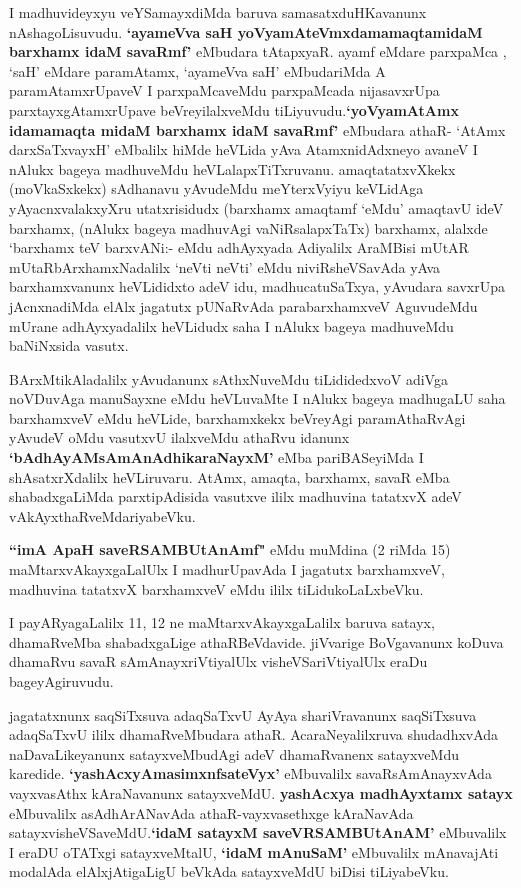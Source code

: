 \begin{artha}
 I madhuvideyxyu veYSamayxdiMda baruva samasatxduHKavanunx nAshagoLisuvudu. \textbf{`ayameVva saH yoV\s yamAteVmxdamamaqtamidaM barxhamx idaM savaRmf'} eMbudara tAtapxyaR. ayamf eMdare parxpaMca , `saH' eMdare paramAtamx, `ayameVva saH' eMbudariMda A paramAtamxrUpaveV I parxpaMcaveMdu parxpaMcada nijasavxrUpa parxtayxgAtamxrUpave beVreyilalxveMdu tiLiyuvudu.\break \textbf{`yoV\s yamAtAmx idamamaqta midaM barxhamx idaM savaRmf'} eMbudara athaR- `AtAmx darxSaTxvayxH' eMbalilx hiMde heVLida yAva AtamxnidAdxneyo avaneV I nAlukx bageya madhuveMdu heVLalapxTiTxruvanu. amaqtatatxvXkekx (moVkaSxkekx) sAdhanavu yAvudeMdu meYterxVyiyu keVLidAga yAyacnxvalakxyXru utatxrisidudx (barxhamx amaqtamf `eMdu' amaqtavU ideV barxhamx, (nAlukx bageya madhuvAgi vaNiRsalapxTaTx) barxhamx, alalxde `barxhamx teV barxvANi:- eMdu adhAyxyada Adiyalilx AraMBisi mUtAR mUtaRbArxhamxNadalilx `neVti neVti' eMdu niviRsheVSavAda yAva barxhamxvanunx heVLididxto adeV idu, madhucatuSaTxya,  yAvudara savxrUpa jAcnxnadiMda elAlx jagatutx pUNaRvAda parabarxhamxveV AguvudeMdu mUrane adhAyxyadalilx heVLidudx saha I nAlukx bageya madhuveMdu baNiNxsida vasutx.
\end{artha}

\begin{artha}
BArxMtikAladalilx yAvudanunx sAthxNuveMdu tiLididedxvoV adiVga noVDuvAga manuSayxne eMdu 
heVLuvaMte I nAlukx bageya madhugaLU saha barxhamxveV eMdu heVLide, barxhamxkekx 
beVreyAgi paramAthaRvAgi yAvudeV oMdu vasutxvU ilalxveMdu athaRvu idanunx 
\textbf{`bAdhAyAMsAmAnAdhikaraNayxM'} eMba pariBASeyiMda I shAsatxrXdalilx heVLiruvaru. AtAmx, 
amaqta, barxhamx, savaR eMba shabadxgaLiMda parxtipAdisida vasutxve ililx madhuvina 
tatatxvX adeV vAkAyxthaRveMdariyabeVku.

\textbf{``imA ApaH saveRSAMBUtAnAmf"} eMdu muMdina (2 riMda 15) maMtarxvAkayxgaLalUlx I madhurUpavAda I jagatutx barxhamxveV, madhuvina tatatxvX barxhamxveV eMdu ililx tiLidukoLaLxbeVku.
\end{artha}

\begin{artha}
I payARyagaLalilx 11, 12 ne maMtarxvAkayxgaLalilx baruva satayx, dhamaRveMba shabadxgaLige athaRBeVdavide. jiVvarige BoVgavanunx koDuva dhamaRvu savaR sAmAnayxriVtiyalUlx visheVSariVtiyalUlx eraDu bageyAgiruvudu.

jagatatxnunx saqSiTxsuva adaqSaTxvU AyAya shariVravanunx saqSiTxsuva adaqSaTxvU ililx dhamaRveMbudara  athaR. AcaraNeyalilxruva shudadhxvAda naDavaLikeyanunx satayxveMbudAgi adeV dhamaRvanenx satayxveMdu karedide. \textbf{`yashAcxyAmasimxnf\break sateVyx'} eMbuvalilx savaRsAmAnayxvAda vayxvasAthx kAraNavanunx satayxveMdU. \textbf{yashAcxya madhAyxtamx satayx} eMbuvalilx asAdhArANavAda athaR-vayxvasethxge kAraNavAda satayxvisheVSaveMdU.\textbf{`idaM satayxM saveVRSAMBUtAnAM'} eMbuvalilx I eraDU oTATxgi satayxveMtalU, \textbf{`idaM mAnuSaM'} eMbuvalilx mAnavajAti modalAda elAlxjAtigaLigU beVkAda satayxveMdU biDisi tiLiyabeVku.
\end{artha}

